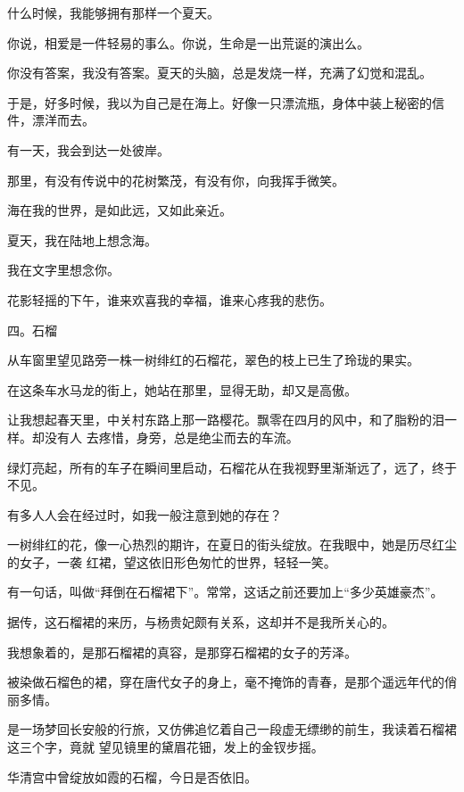 \documentclass[12pt,a4paper]{article}
\def\blankrev{\vspace{1ex}}									%
\newcommand{\subpart}[1]{
	\begingroup \par
	\vspace{1ex} \centering #1
	\par \endgroup \nopagebreak[4]
}
\begin{document}
		\blankrev
		什么时候，我能够拥有那样一个夏天。

		\blankrev
		你说，相爱是一件轻易的事么。你说，生命是一出荒诞的演出么。\par
		你没有答案，我没有答案。夏天的头脑，总是发烧一样，充满了幻觉和混乱。\par
		于是，好多时候，我以为自己是在海上。好像一只漂流瓶，身体中装上秘密的信件，漂洋而去。\par
		有一天，我会到达一处彼岸。\par
		那里，有没有传说中的花树繁茂，有没有你，向我挥手微笑。\par
		海在我的世界，是如此远，又如此亲近。

		\blankrev
		夏天，我在陆地上想念海。\par
		我在文字里想念你。

	\endwriting




		花影轻摇的下午，谁来欢喜我的幸福，谁来心疼我的悲伤。


		\subpart{四。石榴}

		从车窗里望见路旁一株一树绯红的石榴花，翠色的枝上已生了玲珑的果实。\par
		在这条车水马龙的街上，她站在那里，显得无助，却又是高傲。

		让我想起春天里，中关村东路上那一路樱花。飘零在四月的风中，和了脂粉的泪一样。却没有人
	去疼惜，身旁，总是绝尘而去的车流。

		绿灯亮起，所有的车子在瞬间里启动，石榴花从在我视野里渐渐远了，远了，终于不见。\par
		有多人人会在经过时，如我一般注意到她的存在？

		一树绯红的花，像一心热烈的期许，在夏日的街头绽放。在我眼中，她是历尽红尘的女子，一袭
	红裙，望这依旧形色匆忙的世界，轻轻一笑。

		\blankrev
		有一句话，叫做“拜倒在石榴裙下”。常常，这话之前还要加上“多少英雄豪杰”。\par
		据传，这石榴裙的来历，与杨贵妃颇有关系，这却并不是我所关心的。\par
		我想象着的，是那石榴裙的真容，是那穿石榴裙的女子的芳泽。\par
		被染做石榴色的裙，穿在唐代女子的身上，毫不掩饰的青春，是那个遥远年代的俏丽多情。

		是一场梦回长安般的行旅，又仿佛追忆着自己一段虚无缥缈的前生，我读着石榴裙这三个字，竟就
	望见镜里的黛眉花钿，发上的金钗步摇。

		华清宫中曾绽放如霞的石榴，今日是否依旧。
\end{document}
